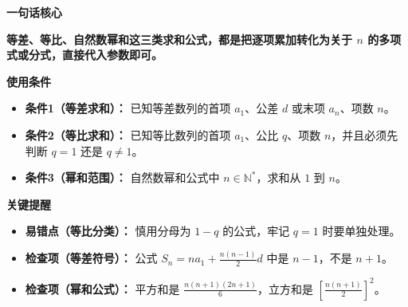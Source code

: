 \begin{summarybox}
	\textbf{\textcolor{CSummary}{一句话核心}}

	\textbf{等差、等比、自然数幂和这三类求和公式，都是把逐项累加转化为关于 \(n\) 的多项式或分式，直接代入参数即可。}

	\medskip
	\textbf{\textcolor{CSummary}{使用条件}}
	\begin{itemize}[leftmargin=*, itemsep=0.5em, topsep=0.4em]
		\item \textbf{条件1（等差求和）：} 已知等差数列的首项 \(a_1\)、公差 \(d\) 或末项 \(a_n\)、项数 \(n\)。
		\item \textbf{条件2（等比求和）：} 已知等比数列的首项 \(a_1\)、公比 \(q\)、项数 \(n\)，并且必须先判断 \(q=1\) 还是 \(q\neq1\)。
		\item \textbf{条件3（幂和范围）：} 自然数幂和公式中 \(n\in\mathbb N^*\)，求和从 \(1\) 到 \(n\)。
	\end{itemize}

	\medskip
	\textbf{\textcolor{CSummary}{关键提醒}}
	\begin{itemize}[leftmargin=*, itemsep=0.5em, topsep=0.4em]
		\item \textbf{易错点（等比分类）：} 慎用分母为 \(1-q\) 的公式，牢记 \(q=1\) 时要单独处理。
		\item \textbf{检查项（等差符号）：} 公式 \(S_n=na_1+\frac{n(n-1)}{2}d\) 中是 \(n-1\)，不是 \(n+1\)。
		\item \textbf{检查项（幂和公式）：} 平方和是 \(\frac{n(n+1)(2n+1)}{6}\)，立方和是 \(\left[\frac{n(n+1)}{2}\right]^2\)。
	\end{itemize}
\end{summarybox}